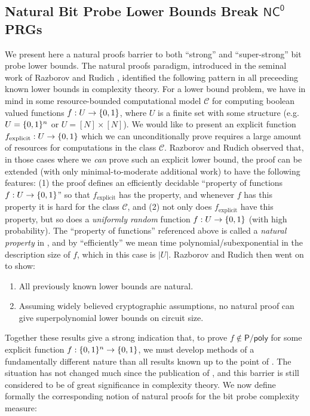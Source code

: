 \subsection{Natural Bit Probe Lower Bounds Break $\mathsf{NC^0}$ PRGs}\label{cellprobe:subsec:natural-vs-prg}
We present here a natural proofs barrier to both ``strong'' and ``super-strong'' bit probe lower bounds. The natural proofs paradigm, introduced in the seminal work of Razborov and Rudich \cite{natural-proofs}, identified the following pattern in all preceeding known lower bounds in complexity theory. For a lower bound problem, we have in mind in some resource-bounded computational model $\mathcal{C}$ for computing boolean valued functions $f: U\to \{0,1\}$, where $U$ is a finite set with some structure (e.g. $U = \{0,1\}^n$ or $U = [N] \times [N]$). We would like to present an explicit function $f_{\mathrm{explicit}}: U \to \{0,1\}$ which we can unconditionally prove requires a large amount of resources for computations in the class $\mathcal{C}$. Razborov and Rudich observed that, in those cases where we \emph{can} prove such an explicit lower bound, the proof can be extended (with only minimal-to-moderate additional work) to have the following features: (1) the proof defines an efficiently decidable ``property of functions $f: U \to \{0,1\}$'' so that $f_{\mathrm{explicit}}$ has the property, and whenever $f$ has this property it is hard for the class $\mathcal{C}$, and (2) not only does $f_{\mathrm{explicit}}$ have this property, but so does a \emph{uniformly random} function $f: U \to \{0,1\}$ (with high probability). The ``property of functions'' referenced above is called a \emph{natural property} in \cite{natural-proofs}, and by ``efficiently'' we mean time polynomial/subexponential in the description size of $f$, which in this case is $|U|$. Razborov and Rudich then went on to show:
\begin{enumerate}
    \item All previously known lower bounds are natural.
    \item Assuming widely believed cryptographic assumptions, no natural proof can give superpolynomial lower bounds on circuit size.
\end{enumerate}
Together these results give a strong indication that, to prove $f \notin \mathsf{P/poly}$ for some explicit function $f: \{0,1\}^n \to \{0,1\}$, we must develop methods of a fundamentally different nature than all results known up to the point of \cite{natural-proofs}. The situation has not changed much since the publication of \cite{natural-proofs}, and this barrier is still considered to be of great significance in complexity theory. We now define formally the corresponding notion of natural proofs for the bit probe complexity measure:

